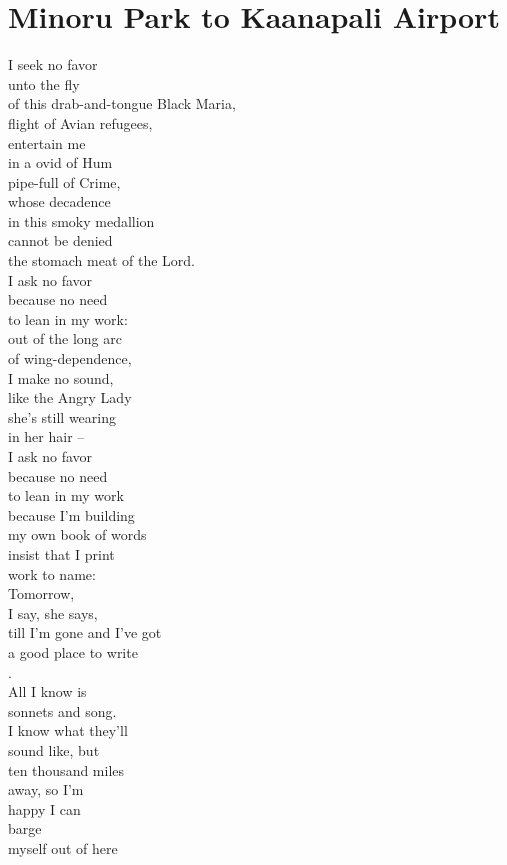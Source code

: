 \documentclass[smalldemyvopaper,11pt,twoside,onecolumn,openright,extrafontsizes]{memoir}
\begin{document}
\chapter{Minoru Park to Kaanapali Airport}
I seek no favor
\\unto the fly
\\of this drab-and-tongue Black Maria,
\\flight of Avian refugees,
\\entertain me
\\in a ovid of Hum
\\pipe-full of Crime,
\\whose decadence
\\in this smoky medallion
\\cannot be denied
\\the stomach meat of the Lord.
\\I ask no favor
\\because no need
\\to lean in my work:
\\out of the long arc
\\of wing-dependence,
\\I make no sound,
\\like the Angry Lady
\\she's still wearing
\\in her hair --
\\I ask no favor
\\because no need
\\to lean in my work
\\because I'm building
\\my own book of words
\\insist that I print
\\work to name:
\\Tomorrow,
\\I say, she says,
\\till I'm gone and I've got
\\a good place to write
\\.
\\All I know is
\\sonnets and song.
\\I know what they'll
\\sound like, but
\\ten thousand miles
\\away, so I'm
\\happy I can
\\barge
\\myself out of here
\end{document}

